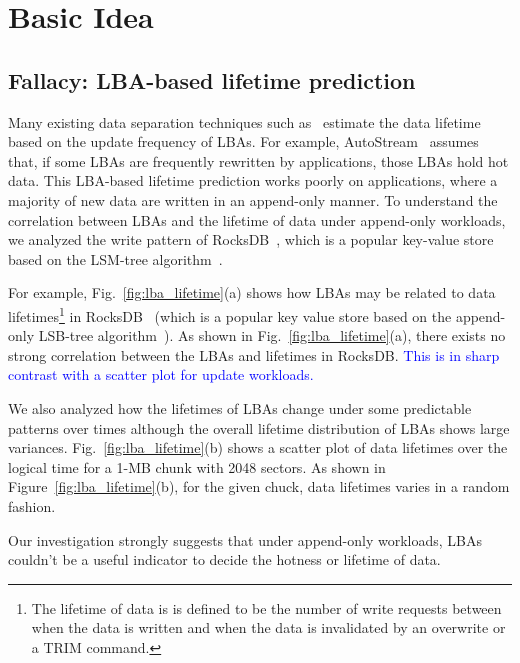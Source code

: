 \section{Basic Idea}
\subsection{Fallacy: LBA-based lifetime prediction}
Many existing data separation techniques such as~\cite{HotCold, AutoStream} 
estimate the data lifetime based on the update frequency of LBAs.  
For example, AutoStream~\cite{AutoStream} assumes that, if
some LBAs are frequently rewritten by applications, those LBAs hold hot data.
This LBA-based lifetime prediction works poorly on applications, where
a majority of new data are written in an append-only manner.  To understand
the correlation between LBAs and the lifetime of data under append-only
workloads, we analyzed the write pattern of RocksDB~\cite{RocksDB}, which is a
popular key-value store based on the LSM-tree algorithm~\cite{LSM}.

For example, Fig.~\ref{fig:lba_lifetime}(a) shows how LBAs may be related 
to data lifetimes\footnote{The lifetime of data is is defined to be 
the number of write requests between when the data is written 
and when the data is invalidated by an overwrite or a TRIM command.}
in RocksDB~\cite{RocksDB} (which is a popular key value store 
based on the append-only LSB-tree algorithm~\cite{LSM}).  
As shown in Fig.~\ref{fig:lba_lifetime}(a), 
there exists no strong correlation between the LBAs and lifetimes in RocksDB.  
\textcolor{blue}{This is in sharp contrast with a scatter plot for update workloads.
}

We also analyzed 
how the lifetimes of LBAs change under some predictable patterns over times 
although the overall lifetime distribution of LBAs shows large variances.
Fig.~\ref{fig:lba_lifetime}(b) shows a scatter plot of data lifetimes over the logical time 
for a 1-MB chunk with 2048 sectors. 
As shown in Figure~\ref{fig:lba_lifetime}(b), 
for the given chuck, data lifetimes varies in a random fashion.  

Our investigation strongly suggests that  under append-only
workloads, LBAs couldn't be a useful indicator to decide
the hotness or lifetime of data.

